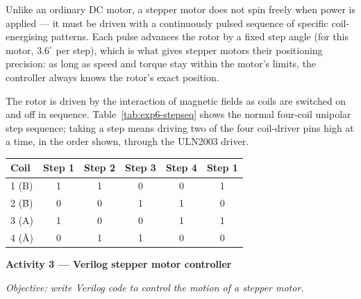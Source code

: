 \begin{procedure}
  \begin{introduction}
    Unlike an ordinary DC motor, a stepper motor does not spin freely when power is applied --- it must be driven with a continuously pulsed sequence of specific coil-energising patterns. Each pulse advances the rotor by a fixed step angle (for this motor, $3.6^\circ$ per step), which is what gives stepper motors their positioning precision: as long as speed and torque stay within the motor's limits, the controller always knows the rotor's exact position.
    \vspace*{1.5em}

    The rotor is driven by the interaction of magnetic fields as coils are switched on and off in sequence. Table~\ref{tab:exp6-stepseq} shows the normal four-coil unipolar step sequence; taking a step means driving two of the four coil-driver pins high at a time, in the order shown, through the ULN2003 driver.
  \end{introduction}

  \needspace{4cm}
  \begin{boxedtable}
    \label{tab:exp6-stepseq}
    {\renewcommand{\arraystretch}{1.5}
      \centering
      \begin{tabular}{lccccc}
        \toprule
        Coil    & Step 1 & Step 2 & Step 3 & Step 4 & Step 1 \\
        \midrule
        1 (B)   & 1      & 1      & 0      & 0      & 1      \\
        2 (\=B) & 0      & 0      & 1      & 1      & 0      \\
        3 (A)   & 1      & 0      & 0      & 1      & 1      \\
        4 (\=A) & 0      & 1      & 1      & 0      & 0      \\
        \bottomrule
      \end{tabular}
    }
  \end{boxedtable}

  \textbf{Activity 3 --- Verilog stepper motor controller}\vspace{2pt}

  \textit{Objective: write Verilog code to control the motion of a stepper motor.}


\end{procedure}
